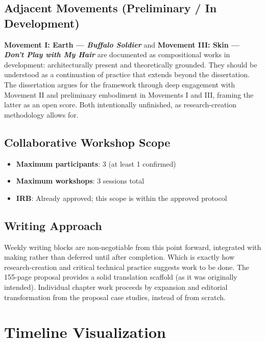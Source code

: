 \subsection*{Adjacent Movements (Preliminary / In Development)}
\textbf{Movement I: Earth — \textit{Buffalo Soldier}} and \textbf{Movement III: Skin — \textit{Don't Play with My Hair}} are documented as compositional works in development: architecturally present and theoretically grounded. They should be understood as a continuation of practice that extends beyond the dissertation. The dissertation argues for the framework through deep engagement with Movement II and preliminary embodiment in Movements I and III, framing the latter as an open score. Both intentionally unfinished, as research-creation methodology allows for.

\subsection*{Collaborative Workshop Scope}
\begin{itemize}[noitemsep]
	\item \textbf{Maximum participants}: 3 (at least 1 confirmed)
	\item \textbf{Maximum workshops}: 3 sessions total
	\item \textbf{IRB}: Already approved; this scope is within the approved protocol
\end{itemize}

\subsection*{Writing Approach}
Weekly writing blocks are non-negotiable from this point forward, integrated with making rather than deferred until after completion. Which is exactly how research-creation and critical technical practice suggests work to be done.  The 155-page proposal provides a solid translation scaffold (as it was originally intended). Individual chapter work proceeds by expansion and editorial transformation from the proposal case studies, instead of from scratch.

\section{Timeline Visualization}

